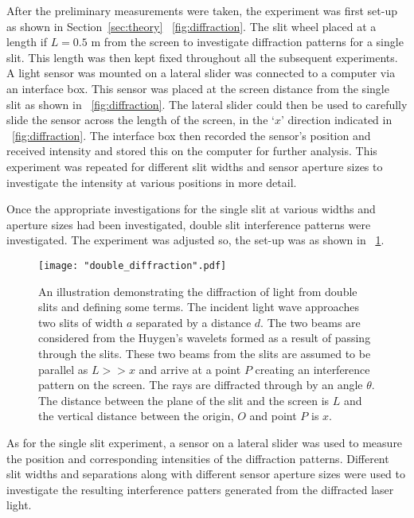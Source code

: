 \documentclass{article}
\newcommand{\figref}[2][\figurename~]{#1\ref{#2}}
\newcommand{\secref}[2][Section~]{#1\ref{#2}}
\begin{document}
\vspace{2mm}
\noindent
After the preliminary measurements were taken, the experiment was first set-up as shown in \secref{sec:theory} \figref{fig:diffraction}. The slit wheel placed at a length if $L = 0.5$ m from the screen to investigate diffraction patterns for a single slit. This length was then kept fixed throughout all the subsequent experiments. A light sensor was mounted on a lateral slider was connected to a computer via an interface box. This sensor was placed at the screen distance from the single slit as shown in \figref{fig:diffraction}. The lateral slider could then be used to carefully slide the sensor across the length of the screen, in the `$x$' direction indicated in \figref{fig:diffraction}. The interface box then recorded the sensor's position and received intensity and stored this on the computer for further analysis. This experiment was repeated for different slit widths and sensor aperture sizes to investigate the intensity at various positions in more detail.

\vspace{2mm}
\noindent
Once the appropriate investigations for the single slit at various widths and aperture sizes had been investigated, double slit interference patterns were investigated. The experiment was adjusted so, the set-up was as shown in \figref{fig:double_diffraction}.

\begin{figure}[h]
\centering
\texttt{[image: "double\_diffraction".pdf]}
\caption{An illustration demonstrating the diffraction of light from double slits and defining some terms. The incident light wave approaches two slits of width $a$ separated by a distance $d$. The two beams are considered from the Huygen's wavelets \cite{Book01} formed as a result of passing through the slits. These two beams from the slits are assumed to be parallel as $L >> x$ and arrive at a point $P$ creating an interference pattern on the screen. The rays are diffracted through by an angle $\theta$. The distance between the plane of the slit and the screen is $L$ and the vertical distance between the origin, $O$ and point $P$ is $x$.}
\label{fig:double_diffraction}
\end{figure}

\vspace{2mm}
\noindent
As for the single slit experiment, a sensor on a lateral slider was used to measure the position and corresponding intensities of the diffraction patterns. Different slit widths and separations along with different sensor aperture sizes were used to investigate the resulting interference patters generated from the diffracted laser light.
\end{document}
